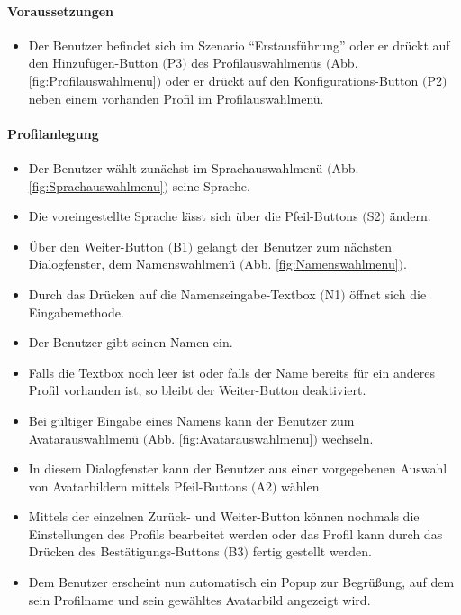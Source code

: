 \paragraph{Voraussetzungen}
\begin{itemize}
	\item Der Benutzer befindet sich im Szenario "`Erstausführung"' oder er drückt auf den Hinzufügen-Button $($P3$)$ des Profilauswahlmenüs $($Abb. \ref{fig:Profilauswahlmenu}$)$ oder er drückt auf den Konfigurations-Button $($P2$)$ neben einem vorhanden Profil im Profilauswahlmenü.
\end{itemize}
\paragraph{Profilanlegung}
\begin{itemize}
	\item Der Benutzer wählt zunächst im Sprachauswahlmenü $($Abb. \ref{fig:Sprachauswahlmenu}$)$ seine Sprache.
	\item Die voreingestellte Sprache lässt sich über die Pfeil-Buttons $($S2$)$ ändern.
	\item Über den Weiter-Button $($B1$)$ gelangt der Benutzer zum nächsten Dialogfenster, dem Namenswahlmenü $($Abb. \ref{fig:Namenswahlmenu}$)$.
	\item Durch das Drücken auf die Namenseingabe-Textbox $($N1$)$ öffnet sich die Eingabemethode.
	\item Der Benutzer gibt seinen Namen ein.
	\item Falls die Textbox noch leer ist oder falls der Name bereits für ein anderes Profil vorhanden ist, so bleibt der Weiter-Button deaktiviert.
	\item Bei gültiger Eingabe eines Namens kann der Benutzer zum Avatarauswahlmenü $($Abb. \ref{fig:Avatarauswahlmenu}$)$ wechseln.
	\item In diesem Dialogfenster kann der Benutzer aus einer vorgegebenen Auswahl von Avatarbildern mittels Pfeil-Buttons $($A2$)$ wählen.
	\item Mittels der einzelnen Zurück- und Weiter-Button können nochmals die Einstellungen des Profils bearbeitet werden oder das Profil kann durch das Drücken des Bestätigungs-Buttons $($B3$)$ fertig gestellt werden.
	\item Dem Benutzer erscheint nun automatisch ein Popup zur Begrüßung, auf dem sein Profilname und sein gewähltes Avatarbild angezeigt wird.
\end{itemize}

